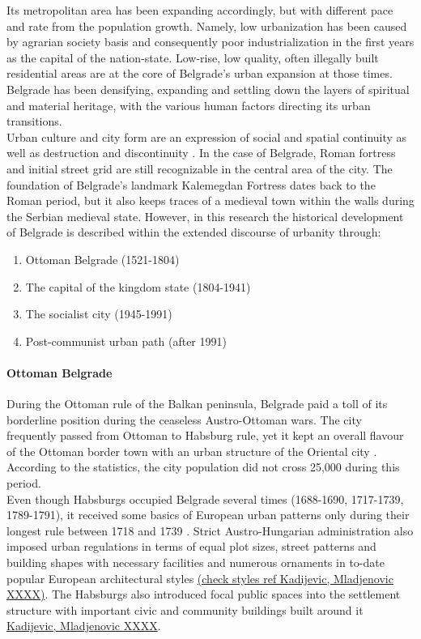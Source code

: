 \documentclass[11pt]{report}
\begin{document}
Its metropolitan area has been expanding accordingly, but with different pace and rate from the population growth. Namely, low urbanization has been caused by agrarian society basis and consequently poor industrialization in the first years as the capital of the nation-state.
Low-rise, low quality, often illegally built residential areas are at the core of Belgrade's urban expansion at those times. Belgrade has been densifying, expanding and settling down the layers of spiritual and material heritage, with the various human factors directing its urban transitions.
\\

Urban culture and city form are an expression of social and spatial continuity as well as destruction and discontinuity \href{ref}{\citealt{grozdanic_belgrade_2008}}. In the case of Belgrade, Roman fortress and initial street grid are still recognizable in the central area of the city.
The foundation of Belgrade's landmark Kalemegdan Fortress dates back to the Roman period, but it also keeps traces of a medieval town within the walls during the Serbian medieval state.
However, in this research the historical development of Belgrade is described within the extended discourse of urbanity through:

\begin{enumerate}
\item Ottoman Belgrade (1521-1804)
\item The capital of the kingdom state (1804-1941)
\item The socialist city (1945-1991)
\item Post-communist urban path (after 1991)
\end{enumerate}

\paragraph{Ottoman Belgrade}

During the Ottoman rule of the Balkan peninsula, Belgrade paid a toll of its borderline position during the ceaseless Austro-Ottoman wars.
The city frequently passed from Ottoman to Habsburg rule, yet it kept an overall flavour of the Ottoman border town with an urban structure of the Oriental city \href{ref}{\citealt{hirt_belgrade_2009}}.
According to the statistics, the city population did not cross 25,000 during this period.
\\

Even though Habsburgs occupied Belgrade several times
(1688-1690, 1717-1739, 1789-1791), it received some basics of European urban patterns only during their longest rule between 1718 and 1739 \href{ref}{\citealt{doytchinov_belgrade_2015}}.
Strict Austro-Hungarian administration also imposed urban regulations in terms of equal plot sizes, street patterns and building shapes with necessary facilities and numerous ornaments in to-date popular European architectural styles \href{ref}{(check styles ref Kadijevic, Mladjenovic XXXX)}.
The Habsburgs also introduced focal public spaces into the settlement structure with important civic and community buildings built around it \href{ref}{Kadijevic, Mladjenovic XXXX}.
\\
\end{document}
